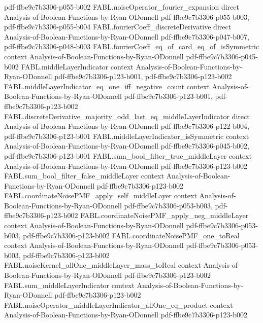 \begin{theorem}
{    pdf-ffbe9c7b3306-p055-b002}
\proofstep
  {FABL.noiseOperator_fourier_expansion}
  {direct}
  {Analysis-of-Boolean-Functions-by-Ryan-ODonnell}
  {pdf-ffbe9c7b3306-p055-b003,
    pdf-ffbe9c7b3306-p055-b004}
\proofstep
  {FABL.fourierCoeff_discreteDerivative}
  {direct}
  {Analysis-of-Boolean-Functions-by-Ryan-ODonnell}
  {pdf-ffbe9c7b3306-p047-b007,
    pdf-ffbe9c7b3306-p048-b003}
\proofstep
  {FABL.fourierCoeff_eq_of_card_eq_of_isSymmetric}
  {context}
  {Analysis-of-Boolean-Functions-by-Ryan-ODonnell}
  {pdf-ffbe9c7b3306-p045-b002}
\proofstep
  {FABL.middleLayerIndicator}
  {context}
  {Analysis-of-Boolean-Functions-by-Ryan-ODonnell}
  {pdf-ffbe9c7b3306-p123-b001,
    pdf-ffbe9c7b3306-p123-b002}
\proofstep
  {FABL.middleLayerIndicator_eq_one_iff_negative_count}
  {context}
  {Analysis-of-Boolean-Functions-by-Ryan-ODonnell}
  {pdf-ffbe9c7b3306-p123-b001,
    pdf-ffbe9c7b3306-p123-b002}
\proofstep
  {FABL.discreteDerivative_majority_odd_last_eq_middleLayerIndicator}
  {direct}
  {Analysis-of-Boolean-Functions-by-Ryan-ODonnell}
  {pdf-ffbe9c7b3306-p122-b004,
    pdf-ffbe9c7b3306-p123-b001}
\proofstep
  {FABL.middleLayerIndicator_isSymmetric}
  {context}
  {Analysis-of-Boolean-Functions-by-Ryan-ODonnell}
  {pdf-ffbe9c7b3306-p045-b002,
    pdf-ffbe9c7b3306-p123-b001}
\proofstep
  {FABL.sum_bool_filter_true_middleLayer}
  {context}
  {Analysis-of-Boolean-Functions-by-Ryan-ODonnell}
  {pdf-ffbe9c7b3306-p123-b002}
\proofstep
  {FABL.sum_bool_filter_false_middleLayer}
  {context}
  {Analysis-of-Boolean-Functions-by-Ryan-ODonnell}
  {pdf-ffbe9c7b3306-p123-b002}
\proofstep
  {FABL.coordinateNoisePMF_apply_self_middleLayer}
  {context}
  {Analysis-of-Boolean-Functions-by-Ryan-ODonnell}
  {pdf-ffbe9c7b3306-p053-b003,
    pdf-ffbe9c7b3306-p123-b002}
\proofstep
  {FABL.coordinateNoisePMF_apply_neg_middleLayer}
  {context}
  {Analysis-of-Boolean-Functions-by-Ryan-ODonnell}
  {pdf-ffbe9c7b3306-p053-b003,
    pdf-ffbe9c7b3306-p123-b002}
\proofstep
  {FABL.coordinateNoisePMF_one_toReal}
  {context}
  {Analysis-of-Boolean-Functions-by-Ryan-ODonnell}
  {pdf-ffbe9c7b3306-p053-b003,
    pdf-ffbe9c7b3306-p123-b002}
\proofstep
  {FABL.noiseKernel_allOne_middleLayer_mass_toReal}
  {context}
  {Analysis-of-Boolean-Functions-by-Ryan-ODonnell}
  {pdf-ffbe9c7b3306-p123-b002}
\proofstep
  {FABL.sum_middleLayerIndicator}
  {context}
  {Analysis-of-Boolean-Functions-by-Ryan-ODonnell}
  {pdf-ffbe9c7b3306-p123-b002}
\proofstep
  {FABL.noiseOperator_middleLayerIndicator_allOne_eq_product}
  {context}
  {Analysis-of-Boolean-Functions-by-Ryan-ODonnell}
  {pdf-ffbe9c7b3306-p123-b002}
\proofstep

\end{theorem}
